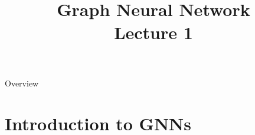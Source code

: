 \documentclass{beamer}
\title[] %
{Graph Neural Network \\Lecture 1}
\date[] %
\begin{document}
\begin{frame}
    \titlepage
\end{frame}

\begin{frame}{Overview}
    \tableofcontents
\end{frame}

\section{Introduction to GNNs}
\end{document}
